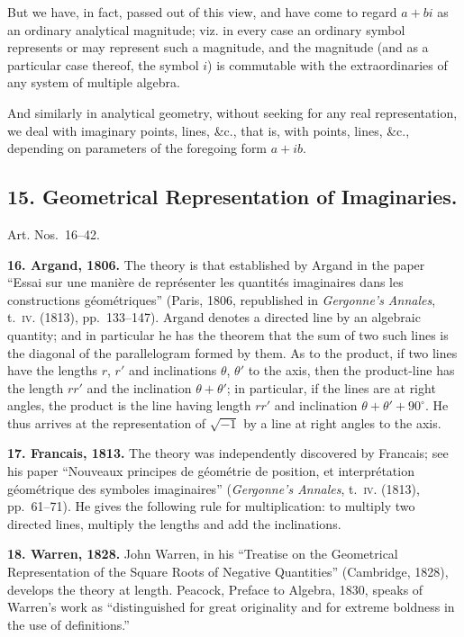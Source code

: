 \documentclass[11pt,a4paper]{article}
\theoremstyle{definition}
\begin{document}
But we have, in fact, passed out of this view, and have come to regard $a + bi$ as an ordinary analytical magnitude; viz. in every case an ordinary symbol represents or may represent such a magnitude, and the magnitude (and as a particular case thereof, the symbol $i$) is commutable with the extraordinaries of any system of multiple algebra.

And similarly in analytical geometry, without seeking for any real representation, we deal with imaginary points, lines, \&c., that is, with points, lines, \&c., depending on parameters of the foregoing form $a + ib$.

\subsection*{15. Geometrical Representation of Imaginaries.}

Art. Nos.~16--42.

\textbf{16. Argand, 1806.} The theory is that established by Argand in the paper ``Essai sur une mani\`ere de repr\'esenter les quantit\'es imaginaires dans les constructions g\'eom\'etriques'' (Paris, 1806, republished in \textit{Gergonne's Annales}, t.~\textsc{iv}. (1813), pp.~133--147). Argand denotes a directed line by an algebraic quantity; and in particular he has the theorem that the sum of two such lines is the diagonal of the parallelogram formed by them. As to the product, if two lines have the lengths $r$, $r'$ and inclinations $\theta$, $\theta'$ to the axis, then the product-line has the length $rr'$ and the inclination $\theta + \theta'$; in particular, if the lines are at right angles, the product is the line having length $rr'$ and inclination $\theta + \theta' + 90^{\circ}$. He thus arrives at the representation of $\sqrt{-1}$ by a line at right angles to the axis.

\textbf{17. Francais, 1813.} The theory was independently discovered by Francais; see his paper ``Nouveaux principes de g\'eom\'etrie de position, et interpr\'etation g\'eom\'etrique des symboles imaginaires'' (\textit{Gergonne's Annales}, t.~\textsc{iv}. (1813), pp.~61--71). He gives the following rule for multiplication: to multiply two directed lines, multiply the lengths and add the inclinations.

\textbf{18. Warren, 1828.} John Warren, in his ``Treatise on the Geometrical Representation of the Square Roots of Negative Quantities'' (Cambridge, 1828), develops the theory at length. Peacock, Preface to Algebra, 1830, speaks of Warren's work as ``distinguished for great originality and for extreme boldness in the use of definitions.''
\end{document}
